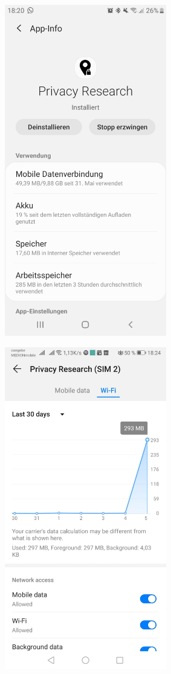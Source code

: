 \begin{center}
\includegraphics[width=200pt]{data/data-usage/data-usage8.jpeg}
\end{center}
\begin{center}
\includegraphics[width=200pt]{data/data-usage/data-usage9-1.jpeg}
\end{center}
